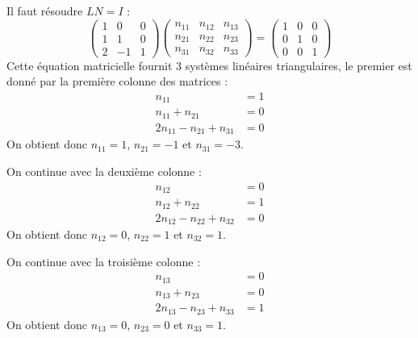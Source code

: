 \documentclass[10pt]{article}
\newenvironment{solution}
    {\par\vspace{0.5em}\begin{mdframed}[linewidth=0.5pt]\par}
    {\end{mdframed}\par\vspace{0.5em}}
\begin{document}
\begin{enumerate}
{\begin{solution}
            Il faut résoudre $L N = I$ : 
            \[
                \begin{pmatrix}
                    1 & 0 & 0 \\
                    1 & 1 & 0 \\
                    2 & -1 & 1
                \end{pmatrix}
                \begin{pmatrix}
                    n_{11} & n_{12} & n_{13} \\
                    n_{21} & n_{22} & n_{23} \\
                    n_{31} & n_{32} & n_{33}
                \end{pmatrix}
                = \begin{pmatrix} 1 & 0 & 0 \\ 0 & 1 & 0 \\ 0 & 0 & 1 \end{pmatrix}
            \]
            Cette équation matricielle fournit 3 systèmes linéaires triangulaires, le premier est donné par la première colonne des matrices : 
            \begin{align*}
                n_{11} &= 1 \\
                n_{11} + n_{21} &= 0 \\
                2 n_{11} - n_{21} + n_{31} &= 0
            \end{align*}
            On obtient donc $n_{11} = 1$, $n_{21} = -1$ et $n_{31} = -3$.
            
            On continue avec la deuxième colonne :
            \begin{align*}
                n_{12} &= 0 \\
                n_{12} + n_{22} &= 1 \\
                2n_{12} - n_{22} + n_{32} &= 0
            \end{align*}
            On obtient donc $n_{12} = 0$, $n_{22} = 1$ et $n_{32} = 1$.
            
            On continue avec la troisième colonne :
            \begin{align*}
                n_{13} &= 0 \\
                n_{13} + n_{23} &= 0 \\
                2n_{13} - n_{23} + n_{33} &= 1
            \end{align*}
            On obtient donc $n_{13} = 0$, $n_{23} = 0$ et $n_{33} = 1$.


\end{solution}}
\end{enumerate}
\end{document}
